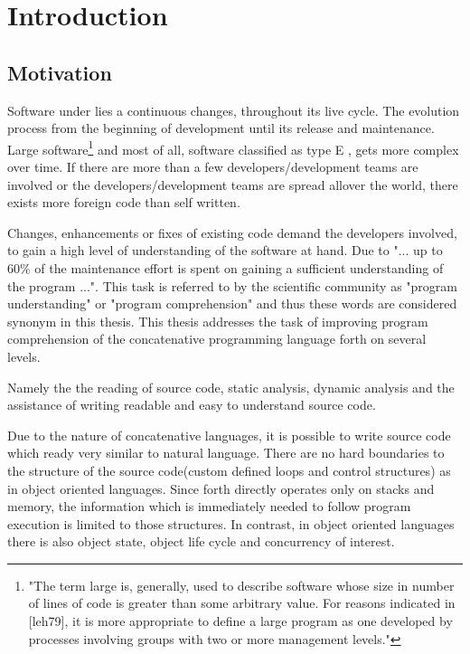 \chapter{Introduction}

\section*{Motivation}

Software under lies a continuous changes, throughout its live cycle.
The evolution process from the beginning of development until its release and maintenance. Large software\footnote{"The term large is, generally, used to describe software whose size in number of lines of code is greater than some arbitrary value. For reasons indicated in [leh79], it is more appropriate to define a large program as one developed by processes involving groups with two or more management levels."\cite{Lehman:2003:SEB:950401.950407}} and most of all, software  classified as type E \cite{Cook:2006:ESS:1115566.1115567}, gets more complex over time. If there are more than a few developers/development teams are involved or the developers/development teams are spread allover the world, there exists more foreign code than self written.

Changes, enhancements or fixes of existing code demand the developers involved, to gain a high level of understanding of the software at hand\cite{Boehm:1976:SE:1311958.1312684}\cite{Singer97anexamination}. Due to \cite{Cornelissen:2009:SSP:1638616.1639301} "... up to 60\% of the maintenance effort is spent on gaining a sufficient understanding of the program ...". This task is referred to by the scientific community as "program understanding" or "program comprehension" and thus these words are considered synonym in this thesis. This thesis addresses the task of improving program comprehension of the concatenative programming language forth on several levels.

Namely the the reading of source code, static analysis, dynamic analysis and the assistance of writing readable and easy to understand source code.

Due to the nature of concatenative languages, it is possible to write source code which ready very similar to natural language. There are no hard boundaries to the structure of the source code(custom defined loops and control structures) as in object oriented languages. Since forth directly operates only on stacks and memory, the information which is immediately needed to follow program execution is limited to those structures. In contrast, in object oriented languages there is also object state, object life cycle and concurrency of interest.

